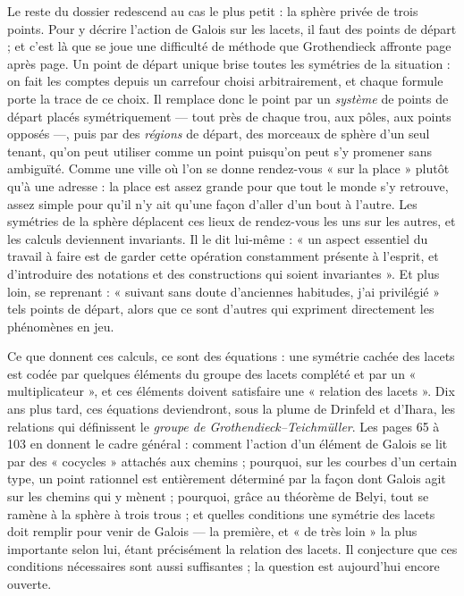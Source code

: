 \documentclass[11pt,a4paper]{article}
\begin{document}
\begin{resume}
Le reste du dossier redescend au cas le plus petit : la sphère privée de trois
points. Pour y décrire l'action de Galois sur les lacets, il faut des points
de départ ; et c'est là que se joue une difficulté de méthode que Grothendieck
affronte page après page. Un point de départ unique brise toutes les
symétries de la situation : on fait les comptes depuis un carrefour choisi
arbitrairement, et chaque formule porte la trace de ce choix. Il remplace
donc le point par un \emph{système} de points de départ placés
symétriquement — tout près de chaque trou, aux pôles, aux points opposés —,
puis par des \emph{régions} de départ, des morceaux de sphère d'un seul
tenant, qu'on peut utiliser comme un point puisqu'on peut s'y promener sans
ambiguïté. Comme une ville où l'on se donne rendez-vous « sur la place » plutôt
qu'à une adresse : la place est assez grande pour que tout le monde s'y
retrouve, assez simple pour qu'il n'y ait qu'une façon d'aller d'un bout à
l'autre. Les symétries de la sphère déplacent ces lieux de rendez-vous les uns
sur les autres, et les calculs deviennent invariants. Il le dit lui-même :
« un aspect essentiel du travail à faire est de garder cette opération
constamment présente à l'esprit, et d'introduire des notations et des
constructions qui soient invariantes ». Et plus loin, se reprenant : « suivant
sans doute d'anciennes habitudes, j'ai privilégié » tels points de départ,
alors que ce sont d'autres qui expriment directement les phénomènes en jeu.

Ce que donnent ces calculs, ce sont des équations : une symétrie cachée des
lacets est codée par quelques éléments du groupe des lacets complété et par un
« multiplicateur », et ces éléments doivent satisfaire une « relation des
lacets ». Dix ans plus tard, ces équations deviendront, sous la plume de
Drinfeld et d'Ihara, les relations qui définissent le \emph{groupe de
Grothendieck–Teichmüller}. Les pages 65 à 103 en donnent le cadre général :
comment l'action d'un élément de Galois se lit par des « cocycles » attachés
aux chemins ; pourquoi, sur les courbes d'un certain type, un point rationnel
est entièrement déterminé par la façon dont Galois agit sur les chemins qui y
mènent ; pourquoi, grâce au théorème de Belyi, tout se ramène à la sphère à
trois trous ; et quelles conditions une symétrie des lacets doit remplir pour
venir de Galois — la première, et « de très loin » la plus importante selon
lui, étant précisément la relation des lacets. Il conjecture que ces
conditions nécessaires sont aussi suffisantes ; la question est aujourd'hui
encore ouverte.


\end{resume}
\end{document}
